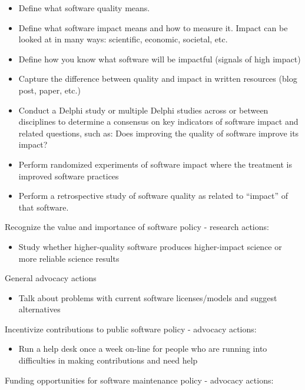 \documentclass[
]{book}
\providecommand{\tightlist}{%
  \setlength{\itemsep}{0pt}\setlength{\parskip}{0pt}}
\begin{document}
\begin{itemize}
\item
  Define what software quality means.
\item
  Define what software impact means and how to measure it. Impact can be looked at in many
  ways: scientific, economic, societal, etc.
\item
  Define how you know what software will be impactful (signals of high impact)
\item
  Capture the difference between quality and impact in written resources (blog post, paper, etc.)
\item
  Conduct a Delphi study or multiple Delphi studies across or between disciplines to determine
  a consensus on key indicators of software impact and related questions, such as: Does improving
  the quality of software improve its impact?
\item
  Perform randomized experiments of software impact where the treatment is improved software practices
\item
  Perform a retrospective study of software quality as related to ``impact'' of that software.
\end{itemize}

Recognize the value and importance of software policy - research actions:

\begin{itemize}
\tightlist
\item
  Study whether higher-quality software produces higher-impact science or more reliable science results
\end{itemize}

General advocacy actions

\begin{itemize}
\tightlist
\item
  Talk about problems with current software licenses/models and suggest alternatives
\end{itemize}

Incentivize contributions to public software policy - advocacy actions:

\begin{itemize}
\tightlist
\item
  Run a help desk once a week on-line for people who are running into difficulties in making contributions and need help
\end{itemize}

Funding opportunities for software maintenance policy - advocacy actions:
\end{document}
